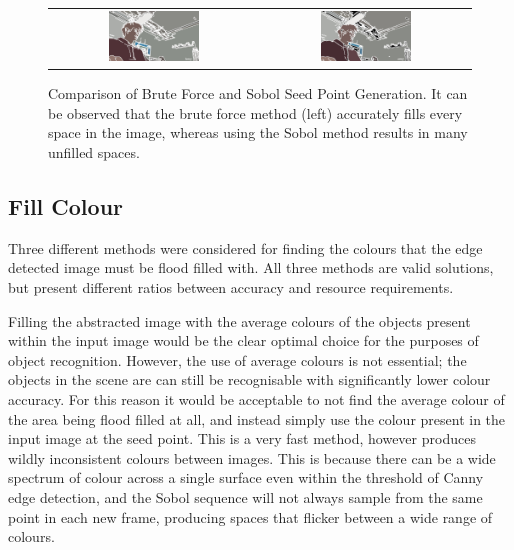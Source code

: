 \begin{figure}[H]
    \begin{center}
    \begin{tabular}{ c c }
        \includegraphics[width=0.45\textwidth]{Figures/Brute.jpg} &
        \includegraphics[width=0.45\textwidth]{Figures/Sobol.jpg}
    \end{tabular}
    \caption[Comparison of Brute Force and Sobol Seed Point Generation]{Comparison of Brute Force and Sobol Seed Point Generation. It can be observed that the brute force method (left) accurately fills every space in the image, whereas using the Sobol method results in many unfilled spaces.}
    \label{fig:BrutevsSobol}
    \end{center}
\end{figure}

\subsection{Fill Colour}

Three different methods were considered for finding the colours that the edge detected image must be flood filled with. All three methods are valid solutions, but present different ratios between accuracy and resource requirements.

Filling the abstracted image with the average colours of the objects present within the input image would be the clear optimal choice for the purposes of object recognition. However, the use of average colours is not essential; the objects in the scene are can still be recognisable with significantly lower colour accuracy. For this reason it would be acceptable to not find the average colour of the area being flood filled at all, and instead simply use the colour present in the input image at the seed point. This is a very fast method, however produces wildly inconsistent colours between images. This is because there can be a wide spectrum of colour across a single surface even within the threshold of Canny edge detection, and the Sobol sequence will not always sample from the same point in each new frame, producing spaces that flicker between a wide range of colours.

